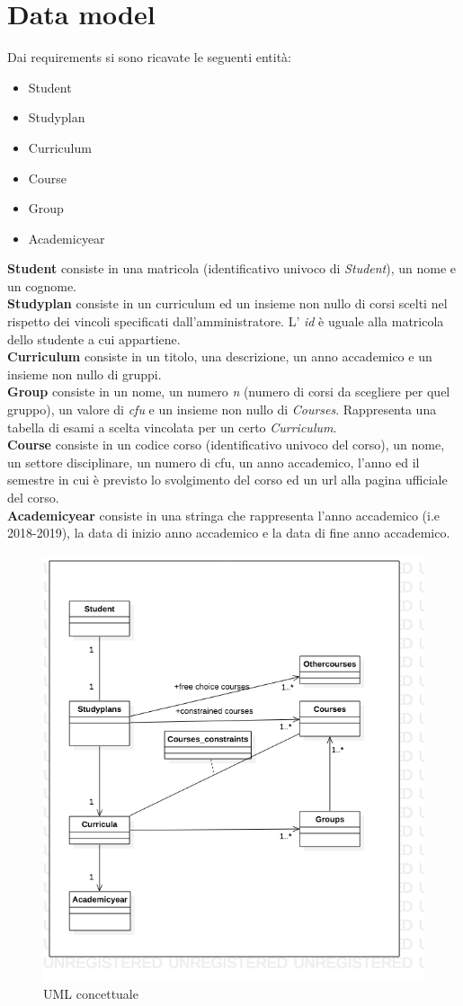 \documentclass{article}
\begin{document}
\section{Data model}
Dai requirements si sono  ricavate le seguenti entità:
\begin{itemize}
\item Student
\item Studyplan
\item Curriculum
\item Course
\item Group
\item Academicyear
\end{itemize}
\textbf{Student} consiste in una matricola (identificativo univoco di \emph{Student}), un nome e un cognome.
\\
\textbf{Studyplan} consiste in un curriculum ed un insieme non nullo di corsi scelti nel rispetto dei vincoli specificati dall'amministratore. L' \emph{id} è uguale alla matricola dello studente a cui appartiene.
\\
\textbf{Curriculum} consiste in un titolo, una descrizione, un anno accademico e un insieme non nullo di gruppi.
\\
\textbf{Group} consiste in un nome, un numero \emph{n} (numero di corsi da scegliere per quel gruppo),  un valore di \emph{cfu} e un insieme non nullo di \emph{Courses}. Rappresenta una  tabella di esami a scelta vincolata per un certo \emph{Curriculum}. 
\\
\textbf{Course} consiste in un codice corso (identificativo univoco del corso), un nome, un settore disciplinare, un numero di cfu, un anno accademico,  l'anno ed il semestre in cui è previsto lo svolgimento del corso ed un url alla pagina ufficiale del corso.
\\
\textbf{Academicyear} consiste in una stringa che rappresenta l'anno accademico (i.e 2018-2019), la data di inizio anno accademico e la data di fine anno accademico.


\begin{figure}[H]
  \begin{center}
   \includegraphics[width=.6\textwidth]{img/UMLconcettuale.png}
     \caption{UML concettuale}
  \label{fig:EntityRelationshipdiagram1}
  \end{center}
\end{figure}
\end{document}
